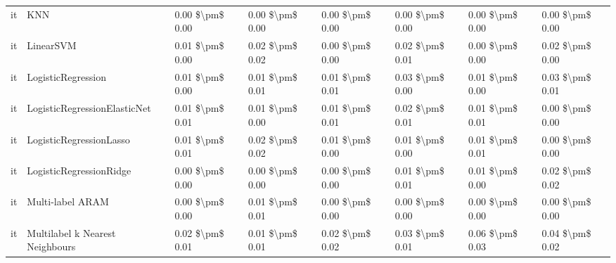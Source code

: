 \begin{tabular}{llllllll}
      it &                             KNN & 0.00 \$\textbackslash pm\$ 0.00 &           0.00 \$\textbackslash pm\$ 0.00 &       0.00 \$\textbackslash pm\$ 0.00 &        0.00 \$\textbackslash pm\$ 0.00 &                         0.00 \$\textbackslash pm\$ 0.00 &     0.00 \$\textbackslash pm\$ 0.00 \\
      it &                       LinearSVM & 0.01 \$\textbackslash pm\$ 0.00 &           0.02 \$\textbackslash pm\$ 0.02 &       0.00 \$\textbackslash pm\$ 0.00 &        0.02 \$\textbackslash pm\$ 0.01 &                         0.00 \$\textbackslash pm\$ 0.00 &     0.02 \$\textbackslash pm\$ 0.00 \\
      it &              LogisticRegression & 0.01 \$\textbackslash pm\$ 0.00 &           0.01 \$\textbackslash pm\$ 0.01 &       0.01 \$\textbackslash pm\$ 0.01 &        0.03 \$\textbackslash pm\$ 0.00 &                         0.01 \$\textbackslash pm\$ 0.00 &     0.03 \$\textbackslash pm\$ 0.01 \\
      it &    LogisticRegressionElasticNet & 0.01 \$\textbackslash pm\$ 0.01 &           0.01 \$\textbackslash pm\$ 0.00 &       0.01 \$\textbackslash pm\$ 0.01 &        0.02 \$\textbackslash pm\$ 0.01 &                         0.01 \$\textbackslash pm\$ 0.01 &     0.00 \$\textbackslash pm\$ 0.00 \\
      it &         LogisticRegressionLasso & 0.01 \$\textbackslash pm\$ 0.01 &           0.02 \$\textbackslash pm\$ 0.02 &       0.01 \$\textbackslash pm\$ 0.00 &        0.01 \$\textbackslash pm\$ 0.00 &                         0.01 \$\textbackslash pm\$ 0.01 &     0.00 \$\textbackslash pm\$ 0.00 \\
      it &         LogisticRegressionRidge & 0.00 \$\textbackslash pm\$ 0.00 &           0.00 \$\textbackslash pm\$ 0.00 &       0.00 \$\textbackslash pm\$ 0.00 &        0.01 \$\textbackslash pm\$ 0.01 &                         0.01 \$\textbackslash pm\$ 0.00 &     0.02 \$\textbackslash pm\$ 0.02 \\
      it &                Multi-label ARAM & 0.00 \$\textbackslash pm\$ 0.00 &           0.01 \$\textbackslash pm\$ 0.01 &       0.00 \$\textbackslash pm\$ 0.00 &        0.00 \$\textbackslash pm\$ 0.00 &                         0.00 \$\textbackslash pm\$ 0.00 &     0.00 \$\textbackslash pm\$ 0.00 \\
      it & Multilabel k Nearest Neighbours & 0.02 \$\textbackslash pm\$ 0.01 &           0.01 \$\textbackslash pm\$ 0.01 &       0.02 \$\textbackslash pm\$ 0.02 &        0.03 \$\textbackslash pm\$ 0.01 &                         0.06 \$\textbackslash pm\$ 0.03 &     0.04 \$\textbackslash pm\$ 0.02 \\

\end{tabular}
